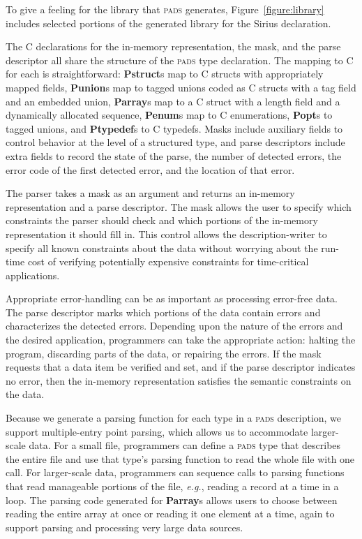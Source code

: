 \documentclass{sigplanconf}
\newcommand{\dibbler}{Sirius}
\newcommand{\figref}[1]{Figure~\ref{#1}}
\newcommand{\eg}{{\em e.g.}}
\newcommand{\bftt}[1]{{\ttfamily\bfseries{#1}}}
\newcommand{\kw}[1]{\bftt{#1}}
\newcommand{\pads}{\textsc{pads}}
\newcommand{\C}{\textsc{C}}
\begin{document}
To give a feeling for the library that \pads{} generates, 
\figref{figure:library} includes selected portions of the generated 
library for the \dibbler{}  declaration.

The \C{} declarations for the in-memory representation, the mask, 
and the parse descriptor all share the structure of the \pads{}
type declaration.  The mapping to \C{} for each is straightforward: 
\kw{Pstruct}s map to \C{} structs with appropriately mapped fields, 
\kw{Punion}s map to tagged unions coded as \C{} structs with a tag field 
and an embedded 
union, \kw{Parray}s map to a \C{} struct with a length field and a 
dynamically allocated sequence, \kw{Penum}s map to \C{} enumerations, \kw{Popt}s 
to tagged unions, and \kw{Ptypedef}s to \C{} typedefs.  Masks include
auxiliary fields to control behavior at the level of a structured
type, and parse descriptors include extra fields to record the 
state of the parse, the number of detected errors, 
the error code of the first detected error, and the location of that error.

The parser takes a mask as an argument and returns an
in-memory representation and a parse descriptor.  
The mask allows the user to specify 
which constraints the parser should check and which portions of the
in-memory representation it should fill in.  This control allows the
description-writer to specify all known constraints about the data
without worrying about the run-time cost of verifying potentially
expensive constraints for time-critical applications.

Appropriate error-handling can be as important as processing
error-free data.  The parse descriptor marks which portions of the
data contain errors and characterizes the detected errors.
Depending upon the nature of the errors and the desired application,
programmers can take the appropriate action: halting the program,
discarding parts of the data, or repairing the errors.
If the mask requests
that a data item be verified and set, and if the parse descriptor
indicates no error, then the in-memory representation satisfies the
semantic constraints on the data.

Because we generate a parsing function for each type in a \pads{} description,
we support multiple-entry point parsing, which allows us to 
accommodate larger-scale data.
For a small file, programmers can define a \pads{} type that describes
the entire file and use that type's parsing function to read the whole
file with one call.  For larger-scale data, programmers can sequence
calls to parsing functions that read manageable portions of the file,
\eg{}, reading a record at a time in a loop.  The parsing code generated
for \kw{Parray}s allows users to choose between reading the entire array
at once or reading it one element at a time, again to support parsing
and processing very large data sources.
\end{document}
